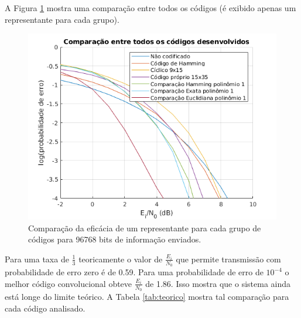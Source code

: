 \newpage
A Figura \ref{fig:geral} mostra uma comparação entre todos os códigos (é exibido apenas um representante para cada grupo).

\begin{figure}[ht]
	\centering
	\captionsetup{justification=centering}
	\includegraphics[width=\linewidth]{floats/geral.png}
	\caption{\label{fig:geral}Comparação da eficácia de um representante para cada grupo de códigos para 96768 bits de informação enviados.}
\end{figure}

Para uma taxa de $\frac{1}{3}$ teoricamente o valor de $\frac{E_i}{N_0}$ que permite transmissão com probabilidade de erro zero é de 0.59. Para uma probabilidade de erro de $10^{-4}$ o melhor código convolucional obteve $\frac{E_i}{N_0}$ de 1.86. Isso mostra que o sistema ainda está longe do limite teórico. A Tabela \ref{tab:teorico} mostra tal comparação para cada código analisado.

